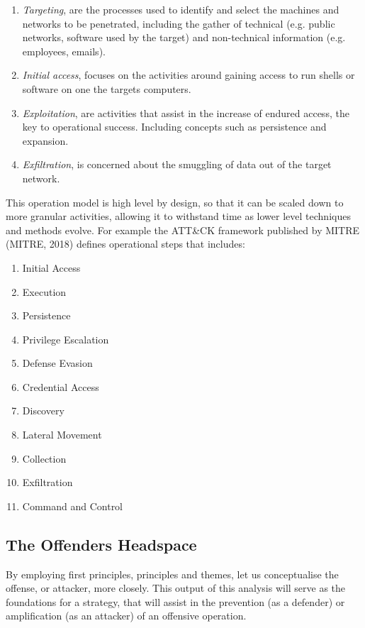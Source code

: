 \documentclass[11pt]{report}
\begin{document}
\begin{enumerate}
	\item \textit{Targeting}, are the processes used to identify and select  the machines and networks to be penetrated, including the gather of technical (e.g. public networks, software used by the target) and non-technical information (e.g. employees, emails).
	\item \textit{Initial access}, focuses on the activities around gaining access to run shells or software on one the targets computers.
	\item \textit{Exploitation}, are activities that assist in the increase of endured access, the key to  operational success. Including concepts such as persistence and expansion.
	\item \textit{Exfiltration}, is concerned about the smuggling of data out of the target network.
\end{enumerate}

This operation model is high level by design, so that it can be scaled down to more granular activities, allowing it to withstand time as lower level techniques and methods evolve. For example the ATT\&CK framework published by MITRE (MITRE, 2018) defines operational steps that includes:

\begin{enumerate}
	\item Initial Access
	\item Execution
	\item Persistence
	\item Privilege Escalation
	\item Defense Evasion
	\item Credential Access
	\item Discovery
	\item Lateral Movement
	\item Collection
	\item Exfiltration
	\item Command and Control
\end{enumerate}



\subsection{The Offenders Headspace}

By employing first principles, principles and themes, let us conceptualise the offense, or attacker, more closely. This output of this analysis will serve as the foundations for a strategy, that will assist in the prevention (as a defender) or amplification (as an attacker) of an offensive operation.
\end{document}
